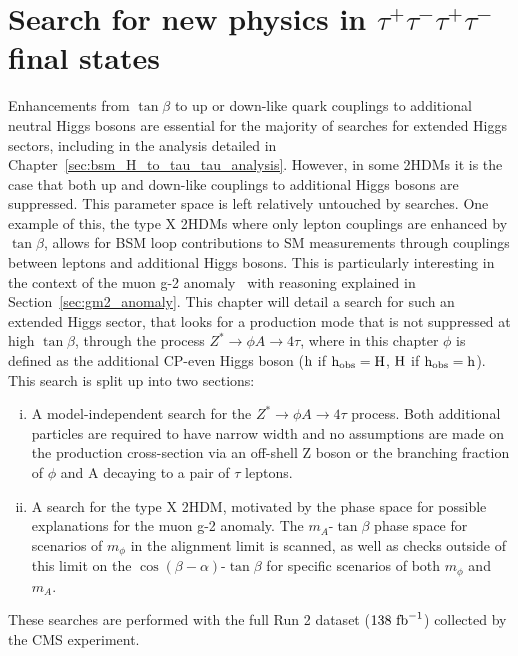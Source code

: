 \chapter{\texorpdfstring{Search for new physics in $\tau^+\tau^-\tau^+\tau^-$ final states}{Search for new physics in tautautautau final states}}
\label{sec:H_A_to_4_tau_analysis}

Enhancements from $\tan\beta$ to up or down-like quark couplings to additional neutral Higgs bosons are essential for the majority of searches for extended Higgs sectors, including in the analysis detailed in Chapter~\ref{sec:bsm_H_to_tau_tau_analysis}.
However, in some \ac{2HDM}s it is the case that both up and down-like couplings to additional Higgs bosons are suppressed.
This parameter space is left relatively untouched by  searches.
One example of this, the type X \ac{2HDM}s where only lepton couplings are enhanced by $\tan\beta$, allows for \ac{BSM} loop contributions to \ac{SM} measurements through couplings between leptons and additional Higgs bosons.
This is particularly interesting in the context of the muon g-2 anomaly~\cite{Muong-2:2006rrc,Muong-2:2021ojo} with reasoning explained in Section~\ref{sec:gm2_anomaly}.
This chapter will detail a search for such an extended Higgs sector, that looks for a production mode that is not suppressed at high $\tan\beta$, through the process $Z^{*}\rightarrow \phi A \rightarrow 4\tau$, where in this chapter $\phi$ is defined as the additional \ac{CP}-even Higgs boson (${\text{h}}$ if ${\text{h}}_{\text{obs}}={\text{H}}$, ${\text{H}}$ if ${\text{h}}_{\text{obs}}={\text{h}}$).
This search is split up into two sections:

\begin{enumerate}[i)]
  \item A model-independent search for the $Z^{*}\rightarrow \phi A \rightarrow 4\tau$ process. Both additional particles are required to have narrow width and no assumptions are made on the production cross-section via an off-shell Z boson or the branching fraction of $\phi$ and A decaying to a pair of $\tau$ leptons.
   \item A search for the type X \ac{2HDM}, motivated by the phase space for possible explanations for the muon g-2 anomaly. The $m_{A}$-$\tan\beta$ phase space for scenarios of $m_\phi$ in the alignment limit is scanned, as well as checks outside of this limit on the $\cos(\beta-\alpha)$-$\tan\beta$ for specific scenarios of both $m_\phi$ and $m_A$.
\end{enumerate}

These searches are performed with the full Run 2 dataset ($138 \text{ fb}^{-1}$) collected by the \ac{CMS} experiment. 

